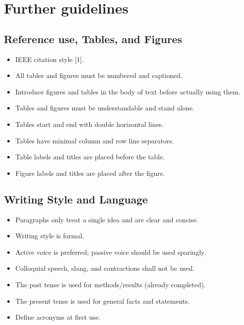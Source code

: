 \appendix
\section{Further guidelines}

\subsection{Reference use, Tables, and Figures}
\begin{itemize}
    \item IEEE citation style [1].
    \item All tables and figures must be numbered and captioned.
    \item Introduce figures and tables in the body of text before actually using them.
    \item Tables and figures must be understandable and stand alone.
    \item Tables start and end with double horizontal lines.
    \item Tables have minimal column and row line separators.
    \item Table labels and titles are placed before the table.
    \item Figure labels and titles are placed after the figure.
\end{itemize}

\subsection{Writing Style and Language}
\begin{itemize}
    \item Paragraphs only treat a single idea and are clear and concise.
    \item Writing style is formal.
    \item Active voice is preferred; passive voice should be used sparingly.
    \item Colloquial speech, slang, and contractions shall not be used.
    \item The past tense is used for methods/results (already completed).
    \item The present tense is used for general facts and statements.
    \item Define acronyms at first use.
\end{itemize}
